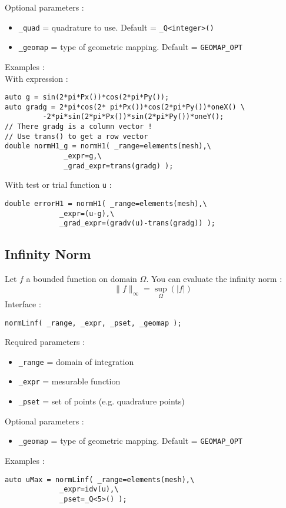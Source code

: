 \noindent Optional parameters :
\begin{itemize}
 \item \lstinline!_quad! = quadrature to use. Default = \lstinline!_Q<integer>()!
 \item \lstinline!_geomap! = type of geometric mapping. Default = \lstinline!GEOMAP_OPT!
\end{itemize}

\noindent Examples :\\
With expression :
\begin{lstlisting}
auto g = sin(2*pi*Px())*cos(2*pi*Py());
auto gradg = 2*pi*cos(2* pi*Px())*cos(2*pi*Py())*oneX() \
	     -2*pi*sin(2*pi*Px())*sin(2*pi*Py())*oneY();
// There gradg is a column vector !
// Use trans() to get a row vector
double normH1_g = normH1( _range=elements(mesh),\
			  _expr=g,\
			  _grad_expr=trans(gradg) );
\end{lstlisting}
With test or trial function \lstinline!u! :
\begin{lstlisting} 
double errorH1 = normH1( _range=elements(mesh),\
			 _expr=(u-g),\ 
			 _grad_expr=(gradv(u)-trans(gradg)) );
\end{lstlisting}


\subsection{Infinity Norm}
Let $f$ a bounded function on domain $\Omega$. You can evaluate the infinity norm :
$$\parallel f \parallel_\infty=\sup_\Omega(|f|)$$
\label{keywords:normLinf}
\noindent Interface :
\begin{lstlisting}
normLinf( _range, _expr, _pset, _geomap );
\end{lstlisting}

\noindent Required parameters :
\begin{itemize}
 \item \lstinline!_range! = domain of integration
 \item \lstinline!_expr! = mesurable function
 \item \lstinline!_pset! = set of points (e.g. quadrature points)
\end{itemize}

\noindent Optional parameters :
\begin{itemize}
 \item \lstinline!_geomap! = type of geometric mapping. Default = \lstinline!GEOMAP_OPT!
\end{itemize}

\noindent Examples :
\begin{lstlisting}
auto uMax = normLinf( _range=elements(mesh),\
		     _expr=idv(u),\
		     _pset=_Q<5>() );
\end{lstlisting}








